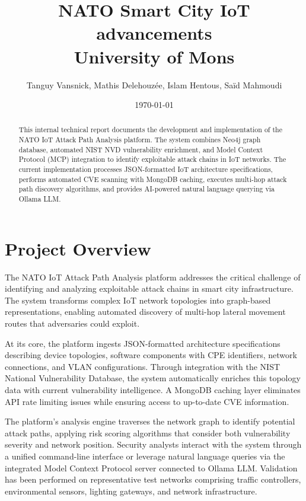 \documentclass[11pt,a4paper]{article}
\title{\textbf{NATO Smart City IoT advancements}\\
\large University of Mons}
\author{Tanguy Vansnick, Mathis Delehouzée, Islam Hentous, Saïd Mahmoudi}
\date{\today}
\begin{document}
\maketitle
\begin{abstract}
This internal technical report documents the development and implementation of the NATO IoT Attack Path Analysis platform. The system combines Neo4j graph database, automated NIST NVD vulnerability enrichment, and Model Context Protocol (MCP) integration to identify exploitable attack chains in IoT networks. The current implementation processes JSON-formatted IoT architecture specifications, performs automated CVE scanning with MongoDB caching, executes multi-hop attack path discovery algorithms, and provides AI-powered natural language querying via Ollama LLM.
\end{abstract}

\section{Project Overview}

The NATO IoT Attack Path Analysis platform addresses the critical challenge of identifying and analyzing exploitable attack chains in smart city infrastructure. The system transforms complex IoT network topologies into graph-based representations, enabling automated discovery of multi-hop lateral movement routes that adversaries could exploit.

At its core, the platform ingests JSON-formatted architecture specifications describing device topologies, software components with CPE identifiers, network connections, and VLAN configurations. Through integration with the NIST National Vulnerability Database, the system automatically enriches this topology data with current vulnerability intelligence. A MongoDB caching layer eliminates API rate limiting issues while ensuring access to up-to-date CVE information.

The platform's analysis engine traverses the network graph to identify potential attack paths, applying risk scoring algorithms that consider both vulnerability severity and network position. Security analysts interact with the system through a unified command-line interface or leverage natural language queries via the integrated Model Context Protocol server connected to Ollama LLM. Validation has been performed on representative test networks comprising traffic controllers, environmental sensors, lighting gateways, and network infrastructure.
\end{document}
